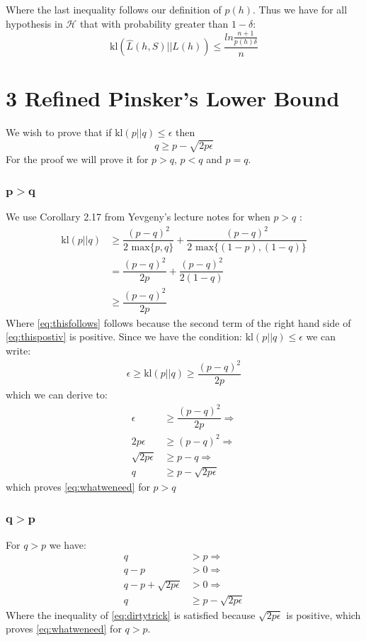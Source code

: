 \documentclass{article}
\begin{document}
Where the last inequality follows our definition of $p(h)$. Thus we have for all hypothesis in $\mathcal{H}$ that with probability greater than $1-\delta$:
$$
\text{kl}(\hat{L}(h,S) || L(h)) \leq \dfrac{ln  \frac{n+1}{p(h) \delta} }{n}
$$
\section{3 Refined Pinsker’s Lower Bound}
We wish to prove that if $\text{kl}(p||q) \leq \epsilon$ then 
\begin{equation}
\label{eq:whatweneed}
q \geq p - \sqrt{2 p \epsilon}
\end{equation}
For the proof we will prove it for $p>q$, $p<q$ and $p=q$.
\subsubsection{$\mathbf{p > q}$}
We use Corollary 2.17 from Yevgeny's lecture notes for when $p>q$ :
\begin{align}
\text{kl}(p||q) &\geq \dfrac{(p-q)^2}{2 \text{ max}\lbrace p,q \rbrace} + \dfrac{(p-q)^2}{2 \text{ max}\lbrace (1-p),(1-q)\rbrace} \\
\label{eq:thispostiv}
&= \dfrac{(p-q)^2}{2 p} + \dfrac{(p-q)^2}{2 (1-q)} \\
\label{eq:thisfollows}
&\geq \dfrac{(p-q)^2}{2p}
\end{align}
Where \eqref{eq:thisfollows} follows because the second term of the right hand side of \eqref{eq:thispostiv} is positive. Since we have the condition: $\text{kl}(p||q) \leq \epsilon$ we can write:
\begin{align}
\epsilon \geq \text{kl}(p||q) \geq \dfrac{(p-q)^2}{2p}
\end{align}
which we can derive to:
\begin{align}
\epsilon &\geq \dfrac{(p-q)^2}{2p} \Rightarrow \\
2p\epsilon &\geq (p-q)^2 \Rightarrow \\
\sqrt{2p \epsilon} &\geq p-q \Rightarrow \\
q &\geq p - \sqrt{ 2 p \epsilon}
\end{align}
which proves \eqref{eq:whatweneed} for $p>q$
\subsubsection{$\mathbf{q > p}$}
For $q>p$ we have:
\begin{align}
q&>p \Rightarrow \\
q-p &> 0 \Rightarrow \\
\label{eq:dirtytrick}
q-p + \sqrt{2 p \epsilon} &> 0 \Rightarrow \\
q &\geq p - \sqrt{2 p \epsilon}
\end{align}
Where the inequality of \eqref{eq:dirtytrick} is satisfied because $\sqrt{2 p \epsilon}$ is positive, which proves \eqref{eq:whatweneed} for $q>p$.
\end{document}
